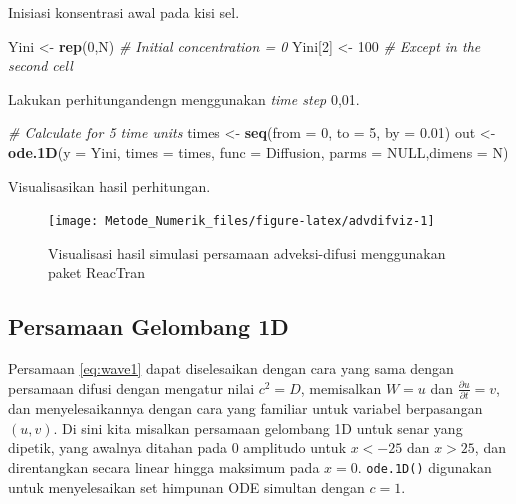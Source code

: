 \documentclass[]{book}
\newenvironment{Shaded}{\begin{snugshade}}{\end{snugshade}}
\newcommand{\CommentTok}[1]{\textcolor[rgb]{0.56,0.35,0.01}{\textit{#1}}}
\newcommand{\DataTypeTok}[1]{\textcolor[rgb]{0.13,0.29,0.53}{#1}}
\newcommand{\DecValTok}[1]{\textcolor[rgb]{0.00,0.00,0.81}{#1}}
\newcommand{\FloatTok}[1]{\textcolor[rgb]{0.00,0.00,0.81}{#1}}
\newcommand{\KeywordTok}[1]{\textcolor[rgb]{0.13,0.29,0.53}{\textbf{#1}}}
\newcommand{\NormalTok}[1]{#1}
\newcommand{\OtherTok}[1]{\textcolor[rgb]{0.56,0.35,0.01}{#1}}
\newcommand{\StringTok}[1]{\textcolor[rgb]{0.31,0.60,0.02}{#1}}
\theoremstyle{definition}
\theoremstyle{definition}
\theoremstyle{definition}
\theoremstyle{remark}
\begin{document}
Inisiasi konsentrasi awal pada kisi sel.

\begin{Shaded}
\begin{Highlighting}[]
\NormalTok{Yini <-}\StringTok{ }\KeywordTok{rep}\NormalTok{(}\DecValTok{0}\NormalTok{,N) }\CommentTok{# Initial concentration = 0}
\NormalTok{Yini[}\DecValTok{2}\NormalTok{] <-}\StringTok{ }\DecValTok{100}   \CommentTok{# Except in the second cell}
\end{Highlighting}
\end{Shaded}

Lakukan perhitungandengn menggunakan \emph{time step} 0,01.

\begin{Shaded}
\begin{Highlighting}[]
\CommentTok{# Calculate for 5 time units}
\NormalTok{times <-}\StringTok{ }\KeywordTok{seq}\NormalTok{(}\DataTypeTok{from =} \DecValTok{0}\NormalTok{, }\DataTypeTok{to =} \DecValTok{5}\NormalTok{, }\DataTypeTok{by =} \FloatTok{0.01}\NormalTok{)}
\NormalTok{out <-}\StringTok{ }\KeywordTok{ode.1D}\NormalTok{(}\DataTypeTok{y =}\NormalTok{ Yini, }\DataTypeTok{times =}\NormalTok{ times, }\DataTypeTok{func =}\NormalTok{ Diffusion,}
             \DataTypeTok{parms =} \OtherTok{NULL}\NormalTok{,}\DataTypeTok{dimens =}\NormalTok{ N)}
\end{Highlighting}
\end{Shaded}

Visualisasikan hasil perhitungan.

\begin{figure}

{\centering \texttt{[image: Metode\_Numerik\_files/figure-latex/advdifviz-1]} 

}

\caption{Visualisasi hasil simulasi persamaan adveksi-difusi menggunakan paket ReacTran}\label{fig:advdifviz}
\end{figure}

\hypertarget{persamaan-gelombang-1d}{%
\subsection{Persamaan Gelombang 1D}\label{persamaan-gelombang-1d}}

Persamaan \eqref{eq:wave1} dapat diselesaikan dengan cara yang sama dengan persamaan difusi dengan mengatur nilai \(c^2=D\), memisalkan \(W=u\) dan \(\frac{\partial u}{\partial t}=v\), dan menyelesaikannya dengan cara yang familiar untuk variabel berpasangan \(\left(u,v\right)\). Di sini kita misalkan persamaan gelombang 1D untuk senar yang dipetik, yang awalnya ditahan pada \(0\) amplitudo untuk \(x <−25\) dan \(x> 25\), dan direntangkan secara linear hingga maksimum pada \(x = 0\). \texttt{ode.1D()} digunakan untuk menyelesaikan set himpunan ODE simultan dengan \(c = 1\).
\end{document}
